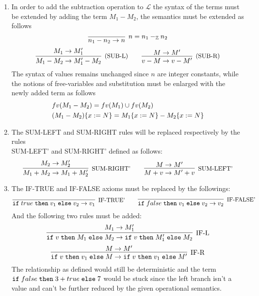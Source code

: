 \begin{enumerate}
	\item In order to add the subtraction operation to $\mathcal{L}$ the syntax
	      of the terms must be extended by adding the term $M_1 - M_2$, the
	      semantics must be extended as follows
	      \[
		      \infer[n = n_1 -_\mathbb{Z} n_2]{n_1 - n_2 \to n}{}
	      \]
	      \[
		      \infer[\text{\small{(SUB-L)}}]{M_1 - M_2 \to M_1' - M_2}{M_1 \to M_1'}
		      \qquad
		      \infer[\text{\small{(SUB-R)}}]{v - M \to v - M'}{M \to M'}
	      \]
	      The syntax of values remains unchanged since $n$ are integer constants,
	      while the notions of free-variables and substitution must be enlarged
	      with the newly added term as follows
	      \begin{align*}
		       & fv(M_1 - M_2) = fv(M_1) \cup fv(M_2)                     \\
		       & (M_1 - M_2)\{x:=N\} = M_1\{x:=N\} - M_2\{x:=N\}
	      \end{align*}
	\item The SUM-LEFT and SUM-RIGHT rules will be replaced respectively by the rules\\
	      SUM-LEFT' and SUM-RIGHT' defined as follows:\\
	      \[
		      \infer[\text{\small{SUM-RIGHT'}}]{\SUM{M_1}{M_2} \to \SUM{M_1}{M_2'}}{M_2 \to M_2'}
		      \qquad
		      \infer[\text{\small{SUM-LEFT'}}]{\SUM{M}{v} \to \SUM{M'}{v}}{M \to M'}
	      \]
	\item The IF-TRUE and IF-FALSE axioms must be replaced by the followings:\\
	      \[
		      \infer[\text{\small{IF-TRUE'}}]{\IF{true}{v_1}{v_2} \to v_1}{}
		      \qquad
		      \infer[\text{\small{IF-FALSE'}}]{\IF{false}{v_1}{v_2} \to v_2}{}
	      \]
	      And the following two rules must be added:\\
	      \[
		      \infer[\text{IF-L}]{\IF{v}{M_1}{M_2} \to \IF{v}{M_1'}{M_2}}{M_1 \to M_1'}
	      \]
	      \[
		      \infer[\text{IF-R}]{\IF{v}{v_1}{M} \to \IF{v}{v_1}{M'}}{M \to M'}
	      \]
	      The relationship as defined would still be deterministic and the term
	      $\texttt{if}\;false\;\texttt{then}\;3+true\;\texttt{else}\;7$ would be stuck since the left branch
	      isn't a value and can't be further reduced by the given operational semantics.
\end{enumerate}
